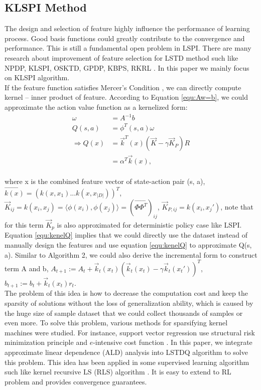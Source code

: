\subsection{KLSPI Method}
The design and selection of feature highly influence the performance of learning process. Good basis functions could greatly contribute to the convergence and performance. This is still a fundamental open problem in  LSPI. There are many research about improvement of feature selection for LSTD method such like NPDP, KLSPI, OSKTD, GPDP, KBPS, RKRL \cite{chen2013online}\cite{kroemer2011non}. In this paper we mainly focus on KLSPI algorithm.\\
If the feature function satisfies Mercer's Condition \cite{vapnik1999overview}, we can directly compute kernel -- inner product of feature. According to Equation \eqref{equ:Aw=b}, we could approximate the action value function as a kernelized form:
\begin{align}
 \omega &= A^{-1} b \nonumber \\
   Q(s, a) &= \phi^T (s, a) \omega \nonumber \\ 
   \Rightarrow Q(x) &= \vec{k}^T (x) ( \vec K - \gamma \vec K_P) R \nonumber \\ 
   &= \alpha ^T \vec{k} (x) \label{equ:kenelQ},
\end{align}
\\
where x is the combined feature vector of state-action pair (s, a),  $\vec{k(x)} =  ( k(x, x_1) ... k(x, x_{\vert D \vert}) )^T$, $\vec{K}_{ij}  = k(x_i, x_j)  = \langle \phi(x_i),  \phi(x_j) \rangle = (\vec{\Phi \Phi^T})_{ij}$, $\vec{K}_{P, ij} = k(x_i, x_j') $, note that for this term $\vec K_p$ is also approximated for deterministic policy case like LSPI. Equation \eqref{equ:kenelQ} implies that we could directly use the dataset instead of manually design the features and use equation \eqref{equ:kenelQ} to approximate Q(s, a). Similar to Algorithm 2, we could also derive the incremental form to construct term A and b, $A_{t+1} := A_t + \vec k_t (x_t)( \vec k_t(x_t) - \gamma \vec k_t(x_t'))^T$,  $b_{t+1} := b_{t} + \vec k_t(x_t) r_t$. \\
The problem of this idea is how to decrease the computation cost and keep the sparsity of solutions without the loss of generalization ability, which is caused by the huge size of sample dataset that we could collect thousands of samples or even more. To solve this problem, various methods for sparsifying kernel machines were studied. For instance, support vector regression use structural risk minimization principle and $e$-intensive cost function \cite{cristianini2000introduction}. In this paper, we integrate approximate linear dependence (ALD) analysis into LSTDQ algorithm to solve this problem. This idea has been applied in some supervised learning algorithm such like kernel recursive LS (RLS) algorithm \cite{engel2004kernel}. It is easy to extend to RL problem and provides convergence guarantees. \\
